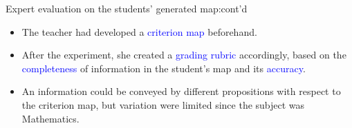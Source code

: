 \begin{frame}{Expert evaluation on the students' generated map:cont'd}
    \begin{itemize}
        \item The teacher had developed a \textcolor{blue}{criterion map} beforehand.
        \item After the experiment, she created a \textcolor{blue}{grading rubric} accordingly, based on the \textcolor{blue}{completeness} of information in the student’s map and its \textcolor{blue}{accuracy}. 
        \item An information could be conveyed by different propositions with respect to the criterion map, but variation were limited since the subject was Mathematics.
    \end{itemize}
\end{frame}

